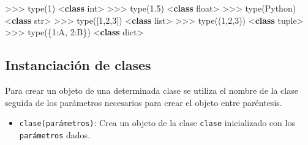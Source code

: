 \documentclass[
  spanish,
  a4paper,
]{scrreport}
\newenvironment{Shaded}{\begin{snugshade}}{\end{snugshade}}
\newcommand{\BuiltInTok}[1]{\textcolor[rgb]{0.00,0.23,0.31}{#1}}
\newcommand{\DecValTok}[1]{\textcolor[rgb]{0.68,0.00,0.00}{#1}}
\newcommand{\FloatTok}[1]{\textcolor[rgb]{0.68,0.00,0.00}{#1}}
\newcommand{\KeywordTok}[1]{\textcolor[rgb]{0.00,0.23,0.31}{\textbf{#1}}}
\newcommand{\NormalTok}[1]{\textcolor[rgb]{0.00,0.23,0.31}{#1}}
\newcommand{\OperatorTok}[1]{\textcolor[rgb]{0.37,0.37,0.37}{#1}}
\newcommand{\StringTok}[1]{\textcolor[rgb]{0.13,0.47,0.30}{#1}}
\providecommand{\tightlist}{%
  \setlength{\itemsep}{0pt}\setlength{\parskip}{0pt}}
\begin{document}
\begin{Shaded}
\begin{Highlighting}[]
\OperatorTok{\textgreater{}\textgreater{}\textgreater{}} \BuiltInTok{type}\NormalTok{(}\DecValTok{1}\NormalTok{)}
\OperatorTok{\textless{}}\KeywordTok{class} \StringTok{\textquotesingle{}int\textquotesingle{}}\OperatorTok{\textgreater{}}
\OperatorTok{\textgreater{}\textgreater{}\textgreater{}} \BuiltInTok{type}\NormalTok{(}\FloatTok{1.5}\NormalTok{)}
\OperatorTok{\textless{}}\KeywordTok{class} \StringTok{\textquotesingle{}float\textquotesingle{}}\OperatorTok{\textgreater{}}
\OperatorTok{\textgreater{}\textgreater{}\textgreater{}} \BuiltInTok{type}\NormalTok{(}\StringTok{\textquotesingle{}Python\textquotesingle{}}\NormalTok{)}
\OperatorTok{\textless{}}\KeywordTok{class} \StringTok{\textquotesingle{}str\textquotesingle{}}\OperatorTok{\textgreater{}}
\OperatorTok{\textgreater{}\textgreater{}\textgreater{}} \BuiltInTok{type}\NormalTok{([}\DecValTok{1}\NormalTok{,}\DecValTok{2}\NormalTok{,}\DecValTok{3}\NormalTok{])}
\OperatorTok{\textless{}}\KeywordTok{class} \StringTok{\textquotesingle{}list\textquotesingle{}}\OperatorTok{\textgreater{}}
\OperatorTok{\textgreater{}\textgreater{}\textgreater{}} \BuiltInTok{type}\NormalTok{((}\DecValTok{1}\NormalTok{,}\DecValTok{2}\NormalTok{,}\DecValTok{3}\NormalTok{))}
\OperatorTok{\textless{}}\KeywordTok{class} \StringTok{\textquotesingle{}tuple\textquotesingle{}}\OperatorTok{\textgreater{}}
\OperatorTok{\textgreater{}\textgreater{}\textgreater{}} \BuiltInTok{type}\NormalTok{(\{}\DecValTok{1}\NormalTok{:}\StringTok{\textquotesingle{}A\textquotesingle{}}\NormalTok{, }\DecValTok{2}\NormalTok{:}\StringTok{\textquotesingle{}B\textquotesingle{}}\NormalTok{\})}
\OperatorTok{\textless{}}\KeywordTok{class} \StringTok{\textquotesingle{}dict\textquotesingle{}}\OperatorTok{\textgreater{}}
\end{Highlighting}
\end{Shaded}

\subsection{Instanciación de clases}\label{instanciaciuxf3n-de-clases}

Para crear un objeto de una determinada clase se utiliza el nombre de la
clase seguida de los parámetros necesarios para crear el objeto entre
paréntesis.

\begin{itemize}
\tightlist
\item
  \texttt{clase(parámetros)}: Crea un objeto de la clase \texttt{clase}
  inicializado con los \texttt{parámetros} dados.
\end{itemize}
\end{document}
